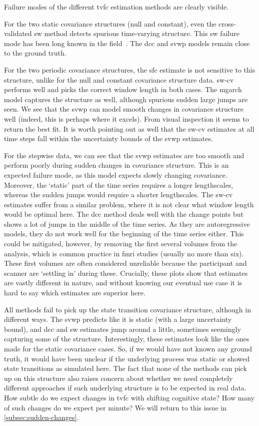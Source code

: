 Failure modes of the different \gls{tvfc} estimation methods are clearly visible.

For the two static covariance structures (null and constant), even the cross-validated \gls{sw} method detects spurious time-varying structure.
This \gls{sw} failure mode has been long known in the field~\parencite{Lindquist2014, Hindriks2016}.
The \gls{dcc} and \gls{svwp} models remain close to the ground truth.

For the two periodic covariance structures, the \gls{sfc} estimate is not sensitive to this structure, unlike for the null and constant covariance structure data.
\gls{sw-cv} performs well and picks the correct window length in both cases.
The \gls{mgarch} model captures the structure as well, although spurious sudden large jumps are seen.
We see that the \gls{svwp} can model smooth changes in covariance structure well (indeed, this is perhaps where it excels).
From visual inspection it seems to return the best fit.
It is worth pointing out as well that the \gls{sw-cv} estimates at all time steps fall within the uncertainty bounds of the \gls{svwp} estimates.

For the stepwise data, we can see that the \gls{svwp} estimates are too smooth and perform poorly during sudden changes in covariance structure.
This is an expected failure mode, as this model expects slowly changing covariance.
Moreover, the `static' part of the time series requires a longer lengthscales, whereas the sudden jumps would require a shorter lengthscales.
The \gls{sw-cv} estimates suffer from a similar problem, where it is not clear what window length would be optimal here.
The \gls{dcc} method deals well with the change points but shows a lot of jumps in the middle of the time series.
As they are autoregressive models, they do not work well for the beginning of the time series either.
This could be mitigated, however, by removing the first several volumes from the analysis, which is common practice in \gls{fmri} studies (usually no more than six).
These first volumes are often considered unreliable because the participant and scanner are `settling in' during these.
Crucially, these plots show that estimates are vastly different in nature, and without knowing our eventual use case it is hard to say which estimates are superior here.

All methods fail to pick up the state transition covariance structure, although in different ways.
The \gls{svwp} predicts like it is static (with a large uncertainty bound), and \gls{dcc} and \gls{sw} estimates jump around a little, sometimes seemingly capturing some of the structure.
Interestingly, these estimates look like the ones made for the static covariance cases.
So, if we would have not known any ground truth, it would have been unclear if the underlying process was static or showed state transitions as simulated here.
The fact that none of the methods can pick up on this structure also raises concern about whether we need completely different approaches if such underlying structure is to be expected in real data.
How subtle do we expect changes in \gls{tvfc} with shifting cognitive state?
How many of such changes do we expect per minute?
We will return to this issue in \cref{subsec:sudden-changes}.


